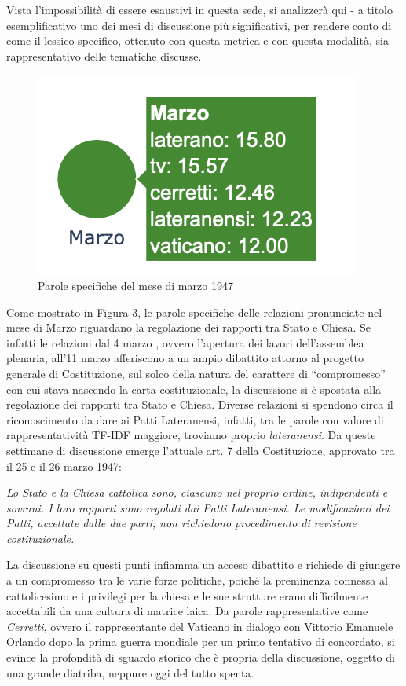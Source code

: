 \documentclass{article}
\begin{document}
Vista l'impossibilità di essere esaustivi in questa sede, si analizzerà qui - a titolo esemplificativo uno dei mesi di discussione più significativi, per rendere conto di come il lessico specifico, ottenuto con questa metrica e con questa modalità, sia rappresentativo delle tematiche discusse. 

\begin{figure}[H]
    \centering
    \includegraphics[width=0.5\linewidth]{marzo.png}
    \caption{Parole specifiche del mese di marzo 1947}
    \label{fig:enter-label}
\end{figure}

Come mostrato in Figura 3, le parole specifiche delle relazioni pronunciate nel mese di Marzo riguardano la regolazione dei rapporti tra Stato e Chiesa. Se infatti le relazioni dal 4 marzo , ovvero l’apertura dei lavori dell’assemblea plenaria, all’11 marzo afferiscono a un ampio dibattito attorno al progetto generale di Costituzione, sul solco della natura del carattere di “compromesso” con cui stava nascendo la carta costituzionale, la discussione si è spostata alla regolazione dei rapporti tra Stato e Chiesa. Diverse relazioni si spendono circa il riconoscimento da dare ai Patti Lateranensi, infatti, tra le parole con valore di rappresentatività TF-IDF maggiore, troviamo proprio \textit{lateranensi}. Da queste settimane di discussione emerge l'attuale art. 7 della Costituzione, approvato tra il 25 e il 26 marzo 1947: 

\textit{{Lo Stato e la Chiesa cattolica sono, ciascuno nel proprio ordine, indipendenti e sovrani. I loro rapporti sono regolati dai Patti Lateranensi. Le modificazioni dei Patti, accettate dalle due parti, non richiedono procedimento di revisione costituzionale.}}

La discussione su questi punti infiamma un acceso dibattito e richiede di giungere a un compromesso tra le varie forze politiche, poiché la preminenza connessa al cattolicesimo e i privilegi per la chiesa e le sue strutture erano difficilmente accettabili da una cultura di matrice laica. Da parole rappresentative  come \textit{Cerretti}, ovvero il rappresentante del Vaticano in dialogo con Vittorio Emanuele Orlando dopo la prima guerra mondiale per un primo tentativo di concordato, si evince la profondità di sguardo storico che è propria della discussione, oggetto di una grande diatriba, neppure oggi del tutto spenta.
\end{document}

